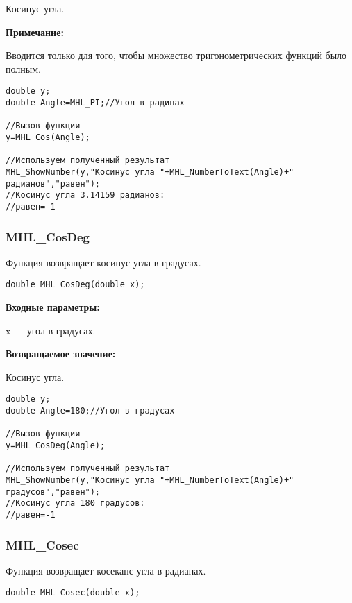 \documentclass[a4paper,12pt]{article}
\begin{document}
Косинус угла.

\textbf{Примечание:}

Вводится только для того, чтобы множество тригонометрических функций было полным.


\begin{lstlisting}[label=code_use_MHL_Cos,caption=Пример использования]
double y;
double Angle=MHL_PI;//Угол в радинах

//Вызов функции
y=MHL_Cos(Angle);

//Используем полученный результат
MHL_ShowNumber(y,"Косинус угла "+MHL_NumberToText(Angle)+" радианов","равен");
//Косинус угла 3.14159 радианов:
//равен=-1
\end{lstlisting}

\subsubsection{MHL\_CosDeg}\label{MHL_CosDeg}

Функция возвращает косинус угла в градусах.


\begin{lstlisting}[label=code_syntax_MHL_CosDeg,caption=Синтаксис]
double MHL_CosDeg(double x);
\end{lstlisting}

\textbf{Входные параметры:}

 x --- угол в градусах.

\textbf{Возвращаемое значение:}

Косинус угла.


\begin{lstlisting}[label=code_use_MHL_CosDeg,caption=Пример использования]
double y;
double Angle=180;//Угол в градусах

//Вызов функции
y=MHL_CosDeg(Angle);

//Используем полученный результат
MHL_ShowNumber(y,"Косинус угла "+MHL_NumberToText(Angle)+" градусов","равен");
//Косинус угла 180 градусов:
//равен=-1
\end{lstlisting}

\subsubsection{MHL\_Cosec}\label{MHL_Cosec}

Функция возвращает косеканс угла в радианах.


\begin{lstlisting}[label=code_syntax_MHL_Cosec,caption=Синтаксис]
double MHL_Cosec(double x);
\end{lstlisting}
\end{document}
